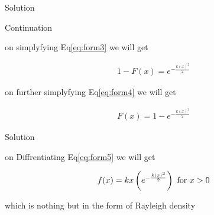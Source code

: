 \documentclass{beamer}
\providecommand{\brak}[1]{\ensuremath{\left(#1\right)}}
\begin{document}
\begin{frame}{Solution}

            \begin{block}{Continuation}
                  
                  on simplyfying Eq\eqref{eq:form3} we will get
                  
                    \begin{align}
                        1-F(x) = {e}^{-\frac{k(x)^{2}}{2}} 
                        \label{eq:form4}
                    \end{align}
                    
                  on further simplyfying Eq\eqref{eq:form4} we will get
                  
                    \begin{align}
                        F(x) = 1 - {e}^{-\frac{k(x)^{2}}{2}} 
                        \label{eq:form5}
                    \end{align}
                
            \end{block}
    
\end{frame}



\begin{frame}{Solution}

            \begin{block}
                  
                  on Diffrentiating Eq\eqref{eq:form5} we will get
                  
                    \begin{align}
                         f(x) =  kx\brak{e^{-\frac{k(x)^{2}}{2}}} \text{ for $ x > 0 $}
                    \end{align}
                    
                    which is nothing but in the form of Rayleigh density
                    
            \end{block}
    
\end{frame}

         
\end{document}
